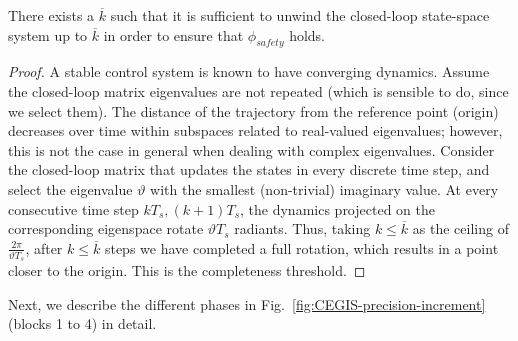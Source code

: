 \documentclass[runningheads,a4paper]{llncs}
\begin{document}
\begin{lemma} There exists a $\overline{k}$ such that it is
sufficient to unwind the closed-loop state-space system up to $\overline{k}$
in order to ensure that $\phi_\mathit{safety}$ holds. 
\end{lemma}

\begin{proof}
%
A stable control system is known to have converging dynamics.  Assume the
closed-loop matrix eigenvalues are not repeated (which is sensible to do,
since we select them).  The distance of the trajectory from the reference
point (origin) decreases over time within subspaces related to real-valued
eigenvalues; however, this is not the case in general when dealing with
complex eigenvalues.  Consider the closed-loop matrix that updates the
states in every discrete time step, and select the eigenvalue $\vartheta$
with the smallest (non-trivial) imaginary value.  At every consecutive time
step $kT_s, (k+1)T_s$, the dynamics projected on the corresponding
eigenspace rotate $\vartheta T_s$ radiants.  Thus, taking
$k{\leq}\overline{k}$ as the ceiling of $\frac{2\pi}{\vartheta T_s}$, after
$k{\leq}\overline{k}$ steps we have completed a full rotation, which results
in a point closer to the origin. This is the completeness threshold. 
%
\end{proof}

\medskip

Next, we describe the different phases in Fig.~\ref{fig:CEGIS-precision-increment}
(blocks 1 to 4) in detail.
\end{document}
